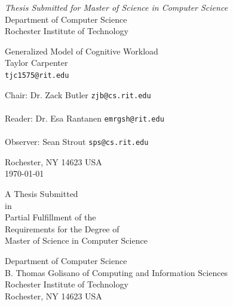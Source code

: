 \documentclass[11pt]{article}
\begin{document}
\thispagestyle{empty}
\begin{center}
\begin{Large}
\emph{Thesis Submitted for Master of Science in Computer Science} \\
Department of Computer Science \\
Rochester Institute of Technology \\
\end{Large}
\vspace{4em}
{\huge Generalized Model of Cognitive Workload} \\
\vspace{3em}
{\LARGE Taylor Carpenter} \\
{\tt tjc1575@rit.edu} \\
\vspace{3em}
\begin{adjustwidth}{.5in}{.5in}
Chair: Dr. Zack Butler \hfill {\tt zjb@cs.rit.edu} \\
\vspace{2em}
\hrulefill \\
\vspace{3em}
Reader: Dr. Esa Rantanen \hfill {\tt emrgsh@rit.edu} \\
\vspace{2em}
\hrulefill \\
\vspace{3em}
Observer: Sean Strout \hfill {\tt sps@cs.rit.edu} \\
\vspace{2em}
\hrulefill
\end{adjustwidth}
\vspace{2em}
Rochester, NY 14623 USA \\
\vspace{2em}
\today
\end{center}
\pagebreak
\thispagestyle{empty}
\begin{center}
\begin{large}
A Thesis Submitted\\
in\\
Partial Fulfillment of the\\
Requirements for the Degree of\\
Master of Science in Computer Science

\vspace{.5in}

Department of Computer Science\\
B. Thomas Golisano of Computing and Information Sciences\\
Rochester Institute of Technology\\
Rochester, NY 14623 USA
\end{large}
\end{center}
\pagebreak
\thispagestyle{empty}
\begin{abstract}
\noindent
\end{abstract}
\clearpage
{}
\tableofcontents
\listoffigures
\listoftables
\pagebreak
\end{document}
